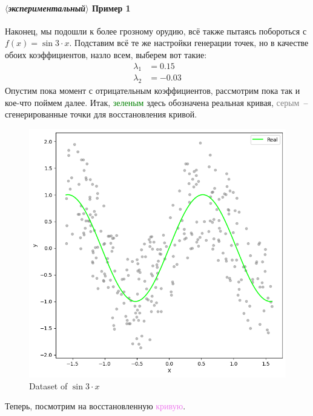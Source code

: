 \documentclass[12pt, a4paper, oneside, final]{article}
\begin{document}
	\paragraph{$\langle$\textit{экспериментальный}$\rangle$ Пример 1}
	Наконец, мы подошли к более грозному орудию, всё также пытаясь побороться с $f(x) = \sin{3 \cdot x}$.
	Подставим всё те же настройки генерации точек, но в качестве обоих коэффициентов, назло всем, выберем вот такие:
	\begin{align*}
		\lambda_{1} &= 0.15 \\
		\lambda_{2} &= -0.03
	\end{align*}
	Опустим пока момент с отрицательным коэффициентов, рассмотрим пока так и кое-что поймем далее.
	Итак, \textcolor{green}{зеленым} здесь обозначена реальная кривая, \textcolor{gray}{серым}~-- сгенерированные точки для восстановления кривой.
	\begin{figure}[H]
		\centering
		\includegraphics[scale = 0.8]{Image/AT2_ELASTIC_DATA.png}
		\caption*{Dataset of $\sin{3 \cdot x}$}
	\end{figure}
	Теперь, посмотрим на восстановленную \textcolor{violet}{кривую}.
\end{document}
